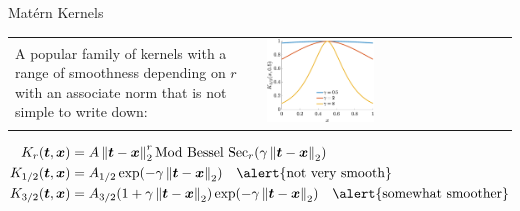 \documentclass[10pt,compress,xcolor={usenames,dvipsnames},aspectratio=169]{beamer}
\begin{document}
\begin{frame}{Mat\'ern Kernels}
	
\vspace{-5ex}
\begin{tabular}{b{}p{}}
A popular family of kernels with a range of smoothness depending on $r$ with an associate norm that is not simple to write down:
& 	\includegraphics[width=0.45\textwidth]{RK-maternkerthreehalfs.eps}
\end{tabular}
\begin{align*}
	K_r(\vt,\vx) &= A \norm[2]{\vt - \vx}^r \text{Mod Bessel Sec}_r (\gamma \norm[2]{\vt - \vx}) \\
	K_{1/2}(\vt,\vx) & = A_{1/2} \exp(-\gamma\norm[2]{\vt - \vx} )  \quad \alert{\text{not very smooth}} \\
	K_{3/2}(\vt,\vx) & = A_{3/2} (1 + \gamma\norm[2]{\vt - \vx} ) \exp(-\gamma\norm[2]{\vt - \vx} )  \quad \alert{\text{somewhat  smoother}}
\end{align*}


\end{frame}
\end{document}
